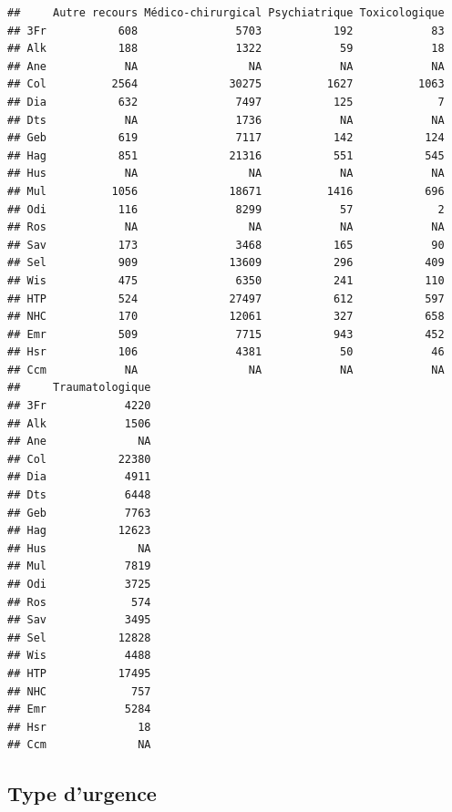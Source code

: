 \documentclass[]{article}
\newenvironment{Shaded}{\begin{snugshade}}{\end{snugshade}}
\newcommand{\KeywordTok}[1]{\textcolor[rgb]{0.13,0.29,0.53}{\textbf{{#1}}}}
\newcommand{\StringTok}[1]{\textcolor[rgb]{0.31,0.60,0.02}{{#1}}}
\newcommand{\NormalTok}[1]{{#1}}
\begin{document}
\begin{verbatim}
##     Autre recours Médico-chirurgical Psychiatrique Toxicologique
## 3Fr           608               5703           192            83
## Alk           188               1322            59            18
## Ane            NA                 NA            NA            NA
## Col          2564              30275          1627          1063
## Dia           632               7497           125             7
## Dts            NA               1736            NA            NA
## Geb           619               7117           142           124
## Hag           851              21316           551           545
## Hus            NA                 NA            NA            NA
## Mul          1056              18671          1416           696
## Odi           116               8299            57             2
## Ros            NA                 NA            NA            NA
## Sav           173               3468           165            90
## Sel           909              13609           296           409
## Wis           475               6350           241           110
## HTP           524              27497           612           597
## NHC           170              12061           327           658
## Emr           509               7715           943           452
## Hsr           106               4381            50            46
## Ccm            NA                 NA            NA            NA
##     Traumatologique
## 3Fr            4220
## Alk            1506
## Ane              NA
## Col           22380
## Dia            4911
## Dts            6448
## Geb            7763
## Hag           12623
## Hus              NA
## Mul            7819
## Odi            3725
## Ros             574
## Sav            3495
## Sel           12828
## Wis            4488
## HTP           17495
## NHC             757
## Emr            5284
## Hsr              18
## Ccm              NA
\end{verbatim}

\subsection{Type d'urgence}\label{type-durgence}

\begin{Shaded}
\end{Shaded}
\end{document}
